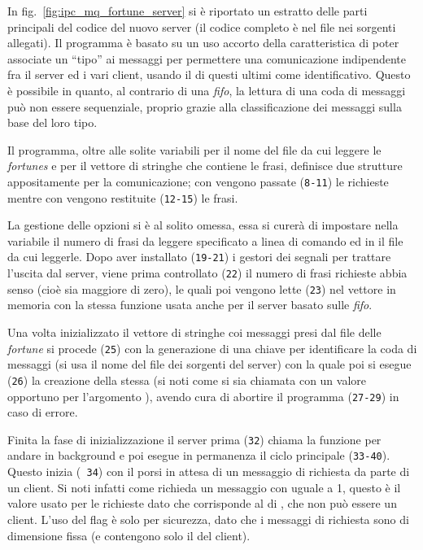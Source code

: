 In fig.~\ref{fig:ipc_mq_fortune_server} si è riportato un estratto delle parti
principali del codice del nuovo server (il codice completo è nel file
 nei sorgenti allegati). Il programma è basato su un
uso accorto della caratteristica di poter associate un ``tipo'' ai messaggi
per permettere una comunicazione indipendente fra il server ed i vari client,
usando il  di questi ultimi come identificativo. Questo è possibile
in quanto, al contrario di una \textit{fifo}, la lettura di una coda di
messaggi può non essere sequenziale, proprio grazie alla classificazione dei
messaggi sulla base del loro tipo.

Il programma, oltre alle solite variabili per il nome del file da cui leggere
le \textit{fortunes} e per il vettore di stringhe che contiene le frasi,
definisce due strutture appositamente per la comunicazione; con
 vengono passate (\texttt{\small 8-11}) le richieste mentre
con  vengono restituite (\texttt{\small 12-15}) le frasi.

La gestione delle opzioni si è al solito omessa, essa si curerà di impostare
nella variabile  il numero di frasi da leggere specificato a linea di
comando ed in  il file da cui leggerle. Dopo aver
installato (\texttt{\small 19-21}) i gestori dei segnali per trattare
l'uscita dal server, viene prima controllato (\texttt{\small 22}) il numero di
frasi richieste abbia senso (cioè sia maggiore di zero), le quali poi vengono
lette (\texttt{\small 23}) nel vettore in memoria con la stessa funzione
 usata anche per il server basato sulle \textit{fifo}.

Una volta inizializzato il vettore di stringhe coi messaggi presi dal file
delle \textit{fortune} si procede (\texttt{\small 25}) con la generazione di
una chiave per identificare la coda di messaggi (si usa il nome del file dei
sorgenti del server) con la quale poi si esegue (\texttt{\small 26}) la
creazione della stessa (si noti come si sia chiamata  con un
valore opportuno per l'argomento ), avendo cura di abortire il
programma (\texttt{\small 27-29}) in caso di errore.

Finita la fase di inizializzazione il server prima (\texttt{\small 32}) chiama
la funzione  per andare in background e poi esegue in permanenza
il ciclo principale (\texttt{\small 33-40}). Questo inizia (\texttt{\small
  34}) con il porsi in attesa di un messaggio di richiesta da parte di un
client. Si noti infatti come  richieda un messaggio con
 uguale a 1, questo è il valore usato per le richieste dato che
corrisponde al  di , che non può essere un client. L'uso
del flag  è solo per sicurezza, dato che i messaggi di
richiesta sono di dimensione fissa (e contengono solo il  del
client).

